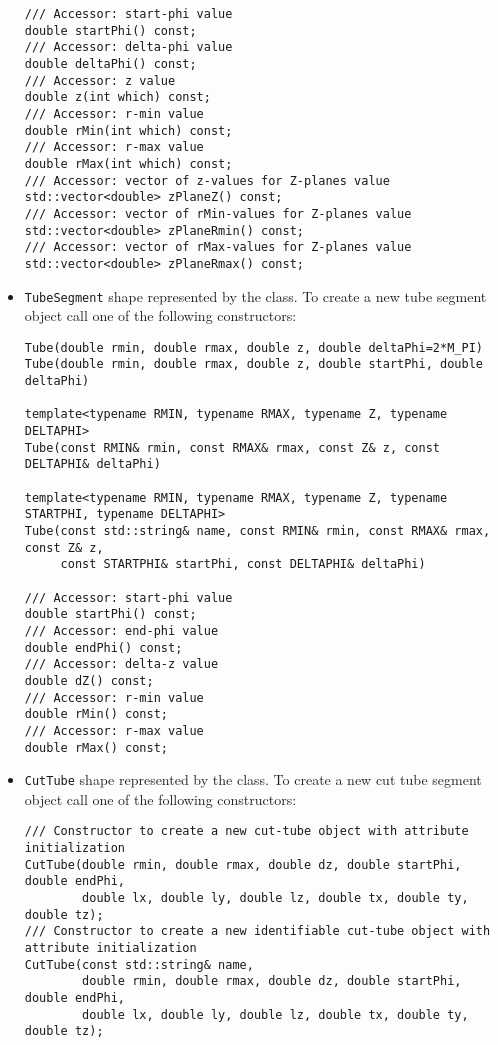 \begin{itemize}
\begin{verbatim}
/// Accessor: start-phi value
double startPhi() const;
/// Accessor: delta-phi value
double deltaPhi() const;
/// Accessor: z value
double z(int which) const;
/// Accessor: r-min value  
double rMin(int which) const;
/// Accessor: r-max value
double rMax(int which) const;
/// Accessor: vector of z-values for Z-planes value
std::vector<double> zPlaneZ() const;
/// Accessor: vector of rMin-values for Z-planes value
std::vector<double> zPlaneRmin() const;
/// Accessor: vector of rMax-values for Z-planes value
std::vector<double> zPlaneRmax() const;
\end{verbatim}

\item \texttt{TubeSegment} shape represented by the  class. To create a new tube segment object call one of the following constructors:
\begin{verbatim}
Tube(double rmin, double rmax, double z, double deltaPhi=2*M_PI)
Tube(double rmin, double rmax, double z, double startPhi, double deltaPhi)

template<typename RMIN, typename RMAX, typename Z, typename DELTAPHI>
Tube(const RMIN& rmin, const RMAX& rmax, const Z& z, const DELTAPHI& deltaPhi)  

template<typename RMIN, typename RMAX, typename Z, typename STARTPHI, typename DELTAPHI>
Tube(const std::string& name, const RMIN& rmin, const RMAX& rmax, const Z& z, 
     const STARTPHI& startPhi, const DELTAPHI& deltaPhi)  

/// Accessor: start-phi value
double startPhi() const;
/// Accessor: end-phi value
double endPhi() const;
/// Accessor: delta-z value
double dZ() const;
/// Accessor: r-min value
double rMin() const;
/// Accessor: r-max value
double rMax() const;
\end{verbatim}

\item \texttt{CutTube} shape represented by the  class.
To create a new cut tube segment object call one of the following constructors:
\begin{verbatim}
/// Constructor to create a new cut-tube object with attribute initialization
CutTube(double rmin, double rmax, double dz, double startPhi, double endPhi,
        double lx, double ly, double lz, double tx, double ty, double tz);
/// Constructor to create a new identifiable cut-tube object with attribute initialization
CutTube(const std::string& name,
        double rmin, double rmax, double dz, double startPhi, double endPhi,
        double lx, double ly, double lz, double tx, double ty, double tz);


\end{verbatim}
\end{itemize}

